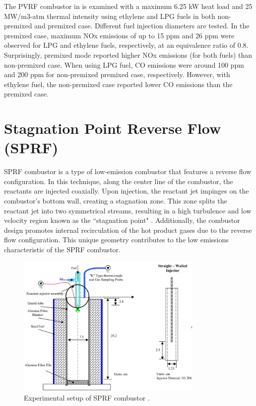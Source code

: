 The PVRF combustor in \cite{AHMAD2023101200} is examined with a maximum 6.25 kW heat load and 25 MW/m3-atm thermal intensity using ethylene and LPG fuels in both non-premixed and premixed case. Different fuel injection diameters are tested. In the premixed case, maximum NOx emissions of up to 15 ppm and 26 ppm were observed for LPG and ethylene fuels, respectively, at an equivalence ratio of 0.8. Surprisingly, premixed mode reported higher NOx emissions (for both fuels) than non-premixed case. When using LPG fuel, CO emissions were around 100 ppm and 200 ppm for non-premixed premixed case, respectively. However, with ethylene fuel, the non-premixed case reported lower CO emissions than the premixed case.

\section{Stagnation Point Reverse Flow (SPRF)}

SPRF combustor is a type of low-emission combustor that features a reverse flow configuration. In this technique, along the center line of the combustor, the reactants are injected coaxially. Upon injection, the reactant jet impinges on the combustor's bottom wall, creating a stagnation zone. This zone splits the reactant jet into two symmetrical streams, resulting in a high turbulence and low velocity region known as the ``stagnation point" \cite{bobba2008SPRF}. Additionally, the combustor design promotes internal recirculation of the hot product gases due to the reverse flow configuration. This unique geometry contributes to the low emissions characteristic of the SPRF combustor.

\begin{figure}[!ht]
    \centering
    \includegraphics[width=0.8\textwidth]{Chapter2/Images/SPRF_.jpeg}
    \caption[Experimental setup of SPRF combustor]{Experimental setup of SPRF combustor \cite{CJNYJS91338}.}
    \label{fig:Ch2SPRF}
\end{figure}

